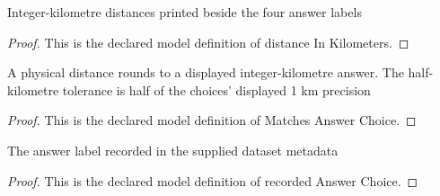 \begin{definition}
  \label{def:physics:phyx-mini-0221:phyxminiproblems-problemphyxmini0221-answerchoice-distanceinkilometers}
  Integer-kilometre distances printed beside the four answer labels
\end{definition}
\begin{proof}
  This is the declared model definition of distance In Kilometers.
\end{proof}
\begin{definition}
  \label{def:physics:phyx-mini-0221:phyxminiproblems-problemphyxmini0221-matchesanswerchoice}
  A physical distance rounds to a displayed integer-kilometre answer. The half-kilometre tolerance is half of the choices' displayed 1 km precision
\end{definition}
\begin{proof}
  This is the declared model definition of Matches Answer Choice.
\end{proof}
\begin{definition}
  \label{def:physics:phyx-mini-0221:phyxminiproblems-problemphyxmini0221-recordedanswerchoice}
  The answer label recorded in the supplied dataset metadata
\end{definition}
\begin{proof}
  This is the declared model definition of recorded Answer Choice.
\end{proof}
